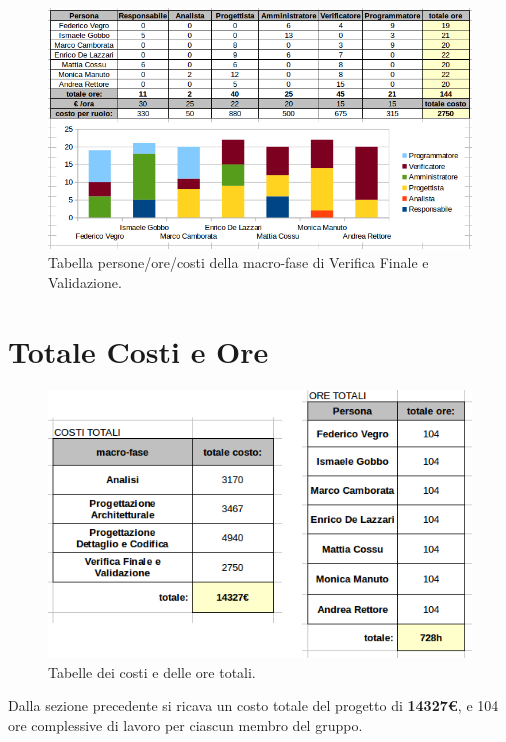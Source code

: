 \begin{figure}[h]
\begin{center}
\includegraphics[scale=0.50]{img/verival-personeorecosti.png}
\caption{Tabella persone/ore/costi della macro-fase di Verifica Finale e Validazione.}
\end{center}
\end{figure}

\newpage

\section{Totale Costi e Ore}

\begin{figure}[h]
\begin{center}
\includegraphics[scale=0.50]{img/totali.png}
\caption{Tabelle dei costi e delle ore totali.}
\end{center}
\end{figure}

Dalla sezione precedente si ricava un costo totale del progetto di \textbf{14327€}, e 104 ore complessive di lavoro per ciascun membro del gruppo.


